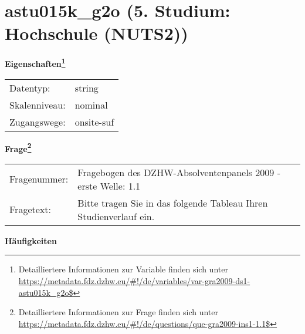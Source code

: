 
    \setcounter{footnote}{0}

    \vspace*{-1.8cm}
	\section{astu015k\_g2o (5. Studium: Hochschule (NUTS2))}
	\label{section:astu015k_g2o}



    \vspace*{0.5cm}
    \noindent\textbf{Eigenschaften\footnote{Detailliertere Informationen zur Variable finden sich unter
		\url{https://metadata.fdz.dzhw.eu/\#!/de/variables/var-gra2009-ds1-astu015k_g2o$}}}\\
	\begin{tabularx}{\hsize}{@{}lX}
	Datentyp: & string \\
	Skalenniveau: & nominal \\
	Zugangswege: &
	  onsite-suf
 \\
    \end{tabularx}



				\vspace*{0.5cm}
                \noindent\textbf{Frage\footnote{Detailliertere Informationen zur Frage finden sich unter
		              \url{https://metadata.fdz.dzhw.eu/\#!/de/questions/que-gra2009-ins1-1.1$}}}\\
				\begin{tabularx}{\hsize}{@{}lX}
					Fragenummer: &
					  Fragebogen des DZHW-Absolventenpanels 2009 - erste Welle:
					  1.1
 \\
					Fragetext: & Bitte tragen Sie in das folgende Tableau Ihren Studienverlauf ein. \\
				\end{tabularx}





        		\vspace*{0.5cm}
                \noindent\textbf{Häufigkeiten}

